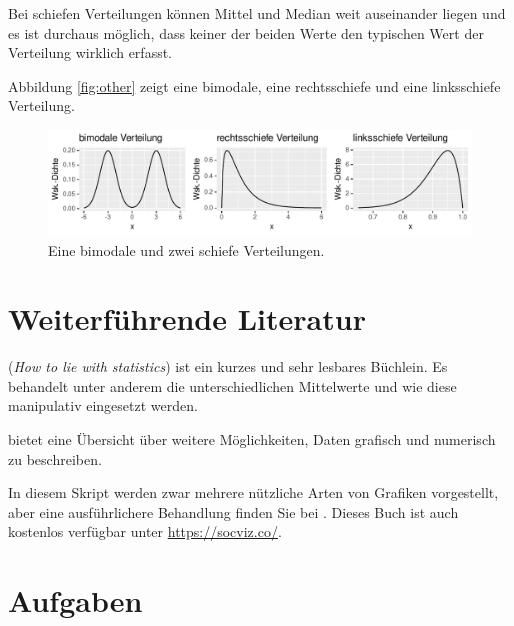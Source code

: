 \documentclass[oneside, 10pt]{book}\usepackage[]{graphicx}\usepackage[]{xcolor}
\newenvironment{knitrout}{}{} %
\begin{document}
Bei schiefen Verteilungen können Mittel und Median weit auseinander liegen
und es ist durchaus möglich, dass keiner der beiden Werte den typischen
Wert der Verteilung wirklich erfasst.

Abbildung \ref{fig:other} zeigt eine bimodale, eine rechtsschiefe und eine linksschiefe Verteilung.

\begin{knitrout}
\color{fgcolor}\begin{figure}[tp]

{\centering \includegraphics[width=.8\textwidth]{figs/unnamed-chunk-116-1} 

}

\caption{Eine bimodale und zwei schiefe Verteilungen.\label{fig:other}}\label{fig:unnamed-chunk-116}
\end{figure}

\end{knitrout}

\section{Weiterführende Literatur}
\citet{Huff1954} (\textit{How to lie with statistics})
ist ein kurzes und sehr lesbares Büchlein. Es behandelt
unter anderem die unterschiedlichen Mittelwerte und wie
diese manipulativ eingesetzt werden.

\citet{Johnson2013} bietet eine Übersicht über weitere
Möglichkeiten, Daten grafisch und numerisch zu beschreiben.

In diesem Skript werden zwar mehrere nützliche Arten von
Grafiken vorgestellt, aber eine ausführlichere Behandlung
finden Sie bei \citet{Healy2019}. Dieses Buch ist auch
kostenlos verfügbar unter \url{https://socviz.co/}.

\section{Aufgaben}
\end{document}
